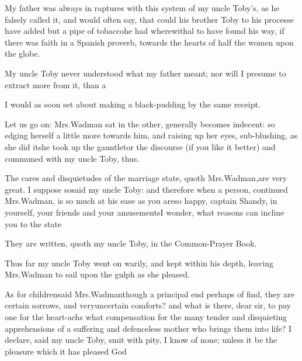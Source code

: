 \documentclass{article}
\begin{document}
\newpage
My father was always in raptures with this system of my uncle
Toby’s, as he falsely called it, and would often say,
that could his brother Toby to his processe have added but a
pipe of tobacco\tsh \break he had wherewithal to have found his
way, if there was faith in a Spanish proverb, towards the
hearts of half the women upon the globe.

My uncle Toby never understood what my father meant; nor
will I presume to extract more from it, than a\break
{}

\newpage
\tsh I would as soon set about making a black-pudding
by the same receipt.

Let us go on: Mrs.\@ Wadman sat in\break
{} 
the other, generally becomes
indecent: so edging herself a little more towards him, and raising
up her eyes, sub-blushing, as she did it\tsh she took up
the gauntlet\tsh or the discourse (if you like it better)
and communed with my uncle Toby, thus.

The cares and disquietudes of the marriage state, quoth Mrs.\@ Wadman,\pb are very
great. I suppose so\tsk said my uncle Toby: and therefore when a person, continued
Mrs.\@ Wadman, is so much at his ease as you are\tsk so happy, captain
Shandy, in yourself, your friends and your amusements\tsk I wonder, what
reasons can incline you to the state\tsh


\tsh They are written, quoth my uncle Toby, in
the Common-Prayer Book.


Thus far my uncle Toby went on warily, and kept within
his depth, leaving Mrs.\@ Wadman to sail upon the gulph as she
pleased.

\enlargethispage\baselineskip
\tsk As for children\tsk said Mrs.\@ Wadman\tsk though a principal end perhaps of\break 
{}
find, they are certain sorrows, and very\pb uncertain comforts? and what is there,
dear sir, to pay one for the heart-achs\tsk\break
what compensation for the many tender and
disquieting apprehensions of a suffering and defenceless mother who brings them into
life? I declare, said my uncle Toby, smit with pity, I know of none; unless it be
the pleasure which it has pleased God\tsh
\end{document}
